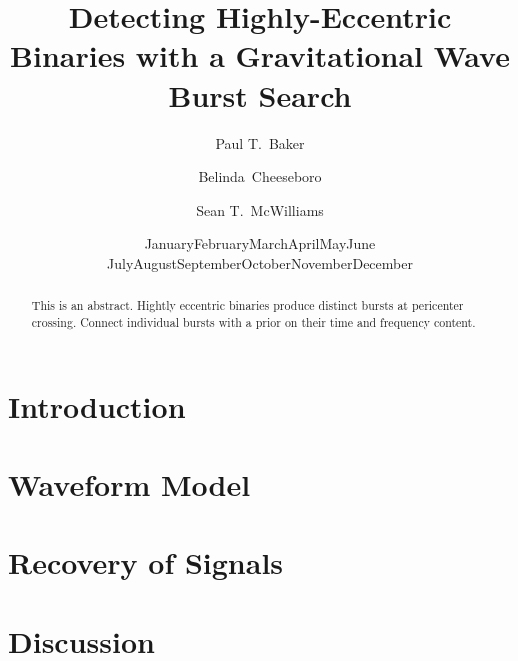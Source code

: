 \documentclass[prd,
               reprint,
               letterpaper,
               groupedaddress,
               linenumbers
              ]{revtex4-1}
\renewcommand{\today}{\number\day\space\ifcase\month\or
  January\or February\or March\or April\or May\or June\or
  July\or August\or September\or October\or November\or December\fi
  \space\number\year}
\begin{document}
\title{Detecting Highly-Eccentric Binaries with a Gravitational Wave Burst Search}

\author{Paul T.~Baker}
\author{Belinda~Cheeseboro}
\author{Sean T.~McWilliams}

\date{\today}

\begin{abstract}
This is an abstract.
Hightly eccentric binaries produce distinct bursts at pericenter crossing.
Connect individual bursts with a prior on their time and frequency content.
\end{abstract}


\maketitle


\section{Introduction}
\label{sec:intro}



\section{Waveform Model}
\label{sec:model}



\section{Recovery of Signals}
\label{sec:recov}



\section{Discussion}
\label{sec:discuss}






\end{document}
